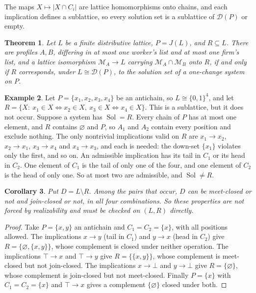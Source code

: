 \documentclass[11pt]{article}
\newtheorem{theorem}{Theorem}
\newtheorem{corollary}[theorem]{Corollary}
\theoremstyle{definition}
\newtheorem{example}[theorem]{Example}
\theoremstyle{remark}
\newcommand{\D}{\mathcal D}
\newcommand{\Sol}{\operatorname{Sol}}
\begin{document}
The maps $X\mapsto|X\cap C_i|$ are lattice homomorphisms onto chains, and each implication defines a sublattice, so every solution set is a sublattice of $\D(P)$ or empty.

\begin{theorem}\label{thm:main}
Let $L$ be a finite distributive lattice, $P=J(L)$, and $R\subseteq L$. There are profiles $A,B$, differing in at most one worker's list and at most one firm's list, and a lattice isomorphism $\mathcal M_A\to L$ carrying $\mathcal M_A\cap\mathcal M_B$ onto $R$, if and only if $R$ corresponds, under $L\cong\D(P)$, to the solution set of a one-change system on $P$.
\end{theorem}

\begin{example}\label{ex:no}
Let $P=\{x_1,x_2,x_3,x_4\}$ be an antichain, so $L\cong\{0,1\}^4$, and let $R=\{X:\ x_1\in X\Leftrightarrow x_2\in X,\ x_3\in X\Leftrightarrow x_4\in X\}$. This is a sublattice, but it does not occur. Suppose a system has $\Sol=R$. Every chain of $P$ has at most one element, and $R$ contains $\varnothing$ and $P$, so $A_1$ and $A_2$ contain every position and exclude nothing. The only nontrivial implications valid on $R$ are $x_1\to x_2$, $x_2\to x_1$, $x_3\to x_4$ and $x_4\to x_3$, and each is needed: the down-set $\{x_1\}$ violates only the first, and so on. An admissible implication has its tail in $C_1$ or its head in $C_2$. One element of $C_1$ is the tail of only one of the four, and one element of $C_2$ is the head of only one. So at most two are admissible, and $\Sol\ne R$.
\end{example}

\begin{corollary}\label{cor:complement}
Put $D=L\setminus R$. Among the pairs that occur, $D$ can be meet-closed or not and join-closed or not, in all four combinations. So these properties are not forced by realizability and must be checked on $(L,R)$ directly.
\end{corollary}

\begin{proof}
Take $P=\{x,y\}$ an antichain and $C_1=C_2=\{x\}$, with all positions allowed. The implications $x\to y$ (tail in $C_1$) and $y\to x$ (head in $C_2$) give $R=\{\varnothing,\{x,y\}\}$, whose complement is closed under neither operation. The implications $\top\to x$ and $\top\to y$ give $R=\{\{x,y\}\}$, whose complement is meet-closed but not join-closed. The implications $x\to\bot$ and $y\to\bot$ give $R=\{\varnothing\}$, whose complement is join-closed but not meet-closed. Finally $P=\{x\}$ with $C_1=C_2=\{x\}$ and $\top\to x$ gives a complement $\{\varnothing\}$ closed under both.
\end{proof}
\end{document}
